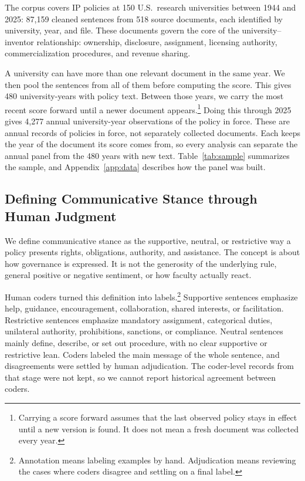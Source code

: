 \documentclass[11pt]{article}
\begin{document}
The corpus covers IP policies at 150 U.S.\ research universities between 1944 and 2025: 87,159 cleaned sentences from 518 source documents, each identified by university, year, and file. These documents govern the core of the university--inventor relationship: ownership, disclosure, assignment, licensing authority, commercialization procedures, and revenue sharing.

A university can have more than one relevant document in the same year. We then pool the sentences from all of them before computing the score. This gives 480 university-years with policy text. Between those years, we carry the most recent score forward until a newer document appears.\footnote{Carrying a score forward assumes that the last observed policy stays in effect until a new version is found. It does not mean a fresh document was collected every year.} Doing this through 2025 gives 4,277 annual university-year observations of the policy in force. These are annual records of policies in force, not separately collected documents. Each keeps the year of the document its score comes from, so every analysis can separate the annual panel from the 480 years with new text. Table~\ref{tab:sample} summarizes the sample, and Appendix~\ref{app:data} describes how the panel was built.



\subsection{Defining Communicative Stance through Human Judgment}

We define communicative stance as the supportive, neutral, or restrictive way a policy presents rights, obligations, authority, and assistance. The concept is about how governance is expressed. It is not the generosity of the underlying rule, general positive or negative sentiment, or how faculty actually react.

Human coders turned this definition into labels.\footnote{Annotation means labeling examples by hand. Adjudication means reviewing the cases where coders disagree and settling on a final label.} Supportive sentences emphasize help, guidance, encouragement, collaboration, shared interests, or facilitation. Restrictive sentences emphasize mandatory assignment, categorical duties, unilateral authority, prohibitions, sanctions, or compliance. Neutral sentences mainly define, describe, or set out procedure, with no clear supportive or restrictive lean. Coders labeled the main message of the whole sentence, and disagreements were settled by human adjudication. The coder-level records from that stage were not kept, so we cannot report historical agreement between coders.
\end{document}
